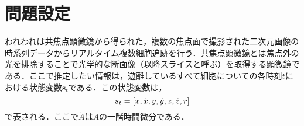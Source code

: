 \section{問題設定}

われわれは共焦点顕微鏡から得られた，複数の焦点面で撮影された二次元画像の時系列データからリアルタイム複数細胞追跡を行う．共焦点顕微鏡とは焦点外の光を排除することで光学的な断面像（以降スライスと呼ぶ）を取得する顕微鏡である．ここで推定したい情報は，遊離しているすべて細胞についての各時刻$t$における状態変数$\bm{s}_t$である．この状態変数は，
\begin{equation}
    \notag
    \bm{s}_t = [x, \dot{x}, y, \dot{y}, z, \dot{z}, r]
\end{equation}
で表される．ここで$\dot{A}$は$A$の一階時間微分である．